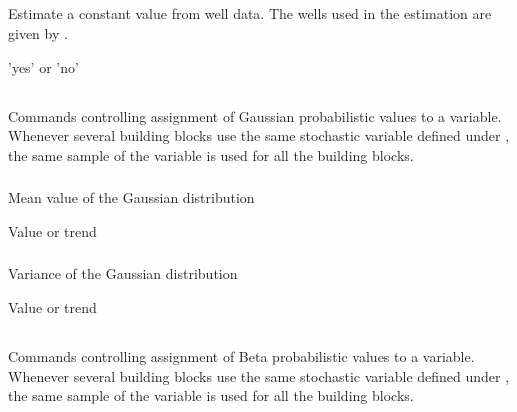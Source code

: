 {\subsection{}
 \slist
   \item \Description Estimate a constant value from well data. The wells used in the estimation are given by .
   \item \Argument 'yes' or 'no'
   \item \Default
 \elist

\subsection{}
 \slist
   \item \Description Commands controlling assignment of Gaussian probabilistic values to a variable. Whenever several building blocks use the same stochastic variable defined under , the same sample of the variable is used for all the building blocks.
   \item \Argument
   \item \Default
 \elist

\subsubsection{}
 \slist
   \item \Description Mean value of the Gaussian distribution
   \item \Argument Value or trend
   \item \Default
 \elist

\subsubsection{}
 \slist
   \item \Description Variance of the Gaussian distribution
   \item \Argument Value or trend
   \item \Default
 \elist

\subsection{}
 \slist
   \item \Description Commands controlling assignment of Beta probabilistic values to a variable. Whenever several building blocks use the same stochastic variable defined under , the same sample of the variable is used for all the building blocks.
   \item \Argument
   \item \Default
 \elist

}
